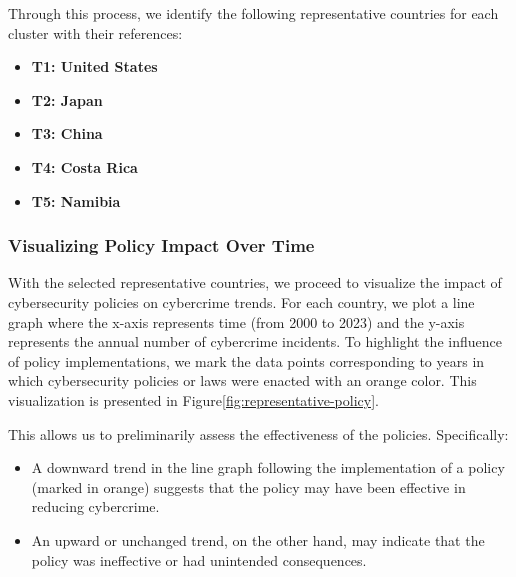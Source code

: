     Through this process, we identify the following representative countries for each cluster with their references:
    \begin{itemize}
        \item \textbf{T1: United States}
        ~\cite{
            congress-website,
            nist-website,
            dhs-website,
            sec-website,
            whitehouse-website,
            investigatory-powers-act-2016,
            ncsc-uk,
            telecom-security-act-2021,
            uk-cyber-security-requirements-2024,
            uk-cybersecurity-timeline-2024}
        \item \textbf{T2: Japan}
        ~\cite{
            it-basic-law-japan,
            ppc-legal-japan,
            nisc-japan,
            mofa-japan,
            japan-law-translation,
            cs-strategy-2015-japan,
            cs-strategy-2018-japan,
            telecom-business-act-japan,
            cs-strategy-2021-japan}
        \item \textbf{T3: China}
        ~\cite{
            international-cybercrime,
            cybersecurity-law-china,
            internet-censorship-china,
            china-data-security-regulations,
            cryptography-law-china}
        \item \textbf{T4: Costa Rica}
        ~\cite{
            costa-rica-cybersecurity-strategy,
            costa-rica-pop-up}
        \item \textbf{T5: Namibia}
        ~\cite{
            namibia-pop-up,
            namibia-digital-odyssey,
            namibia-cybersecurity-strategy}
    \end{itemize}

\subsubsection*{Visualizing Policy Impact Over Time} %
    With the selected representative countries,
    we proceed to visualize the impact of cybersecurity policies on cybercrime trends.
    For each country, we plot a line graph where
    the x-axis represents time (from 2000 to 2023) and the y-axis represents the annual number of cybercrime incidents.
    To highlight the influence of policy implementations,
    we mark the data points corresponding to years in which cybersecurity policies or laws were enacted with an orange color.
    This visualization is presented in Figure\ref{fig:representative-policy}.

    This allows us to preliminarily assess the effectiveness of the policies.
    Specifically:
    \begin{itemize}
        \item A downward trend in the line graph following the implementation of a policy (marked in orange)
        suggests that the policy may have been effective in reducing cybercrime.
        \item An upward or unchanged trend, on the other hand,
        may indicate that the policy was ineffective or had unintended consequences.
    \end{itemize}

